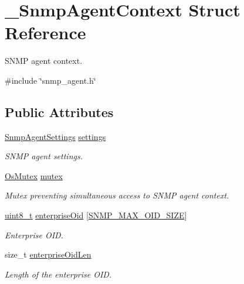 \hypertarget{struct__SnmpAgentContext}{}\section{\+\_\+\+Snmp\+Agent\+Context Struct Reference}
\label{struct__SnmpAgentContext}


S\+N\+MP agent context.  




{\ttfamily \#include \char`\"{}snmp\+\_\+agent.\+h\char`\"{}}

\subsection*{Public Attributes}
\begin{DoxyCompactItemize}
\item 
\hyperlink{structSnmpAgentSettings}{Snmp\+Agent\+Settings} \hyperlink{struct__SnmpAgentContext_a5f6fe35e052673ddcedb1bf8c4775631}{settings}
\begin{DoxyCompactList}\small\item\em S\+N\+MP agent settings. \end{DoxyCompactList}\item 
\hyperlink{structOsMutex}{Os\+Mutex} \hyperlink{struct__SnmpAgentContext_ac55df4650c324346673f1560eda9b6b9}{mutex}
\begin{DoxyCompactList}\small\item\em Mutex preventing simultaneous access to S\+N\+MP agent context. \end{DoxyCompactList}\item 
\hyperlink{stdint_8h_aba7bc1797add20fe3efdf37ced1182c5}{uint8\+\_\+t} \hyperlink{struct__SnmpAgentContext_ab8e41a5f50582ca2947bd0a4eb2b08f9}{enterprise\+Oid} \mbox{[}\hyperlink{snmp__common_8h_a7eee56441ee1b961702e8b4cbe9586a7}{S\+N\+M\+P\+\_\+\+M\+A\+X\+\_\+\+O\+I\+D\+\_\+\+S\+I\+ZE}\mbox{]}
\begin{DoxyCompactList}\small\item\em Enterprise O\+ID. \end{DoxyCompactList}\item 
size\+\_\+t \hyperlink{struct__SnmpAgentContext_a6f757ea4168b9684ff4c0c9d660ff179}{enterprise\+Oid\+Len}
\begin{DoxyCompactList}\small\item\em Length of the enterprise O\+ID. \end{DoxyCompactList}\item 

\end{DoxyCompactItemize}
